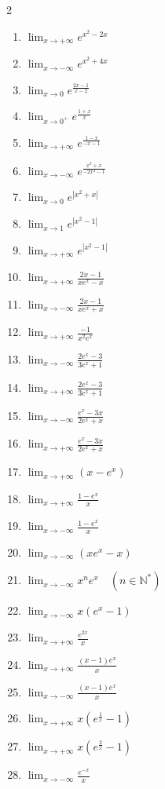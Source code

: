 \documentclass[12pt,a4paper]{article}
\begin{document}
\begin{multicols}{2}
\begin{enumerate}
\item $\lim_{x \to +\infty} e^{x^2 - 2x}$
\item $\lim_{x \to -\infty} e^{x^2 + 4x}$
\item $\lim_{x \to 0} e^{\frac{2x - 1}{x - 2}}$
\item $\lim_{x \to 0^+} e^{\frac{1 + x}{x}}$

\item $\lim_{x \to +\infty} e^{\frac{1 - x}{-x - 1}}$
\item $\lim_{x \to -\infty} e^{\frac{x^3 + x}{-2x^2 - 1}}$
\item $\lim_{x \to 0} e^{|x^2 + x|}$
\item $\lim_{x \to 1} e^{|x^2 - 1|}$

\item $\lim_{x \to +\infty} e^{|x^2 - 1|}$
\item $\lim_{x \to +\infty} \frac{2x - 1}{x e^x - x}$
\item $\lim_{x \to -\infty} \frac{2x - 1}{x e^x + x}$
\item $\lim_{x \to +\infty} \frac{-1}{x^2 e^x}$

\item $\lim_{x \to -\infty} \frac{2e^x - 3}{3e^x + 1}$
\item $\lim_{x \to +\infty} \frac{2e^x - 3}{3e^x + 1}$
\item $\lim_{x \to -\infty} \frac{e^x - 3x}{2e^x + x}$
\item $\lim_{x \to +\infty} \frac{e^x - 3x}{2e^x + x}$

\item $\lim_{x \to +\infty} (x - e^x)$
\item $\lim_{x \to +\infty} \frac{1 - e^x}{x}$
\item $\lim_{x \to -\infty} \frac{1 - e^x}{x}$
\item $\lim_{x \to -\infty} (x e^x - x)$

\item $\lim_{x \to -\infty} x^n e^x \quad (n \in \mathbb{N}^*)$
\item $\lim_{x \to -\infty} x(e^x - 1)$
\item $\lim_{x \to +\infty} \frac{e^{2x}}{x}$
\item $\lim_{x \to +\infty} \frac{(x - 1)e^x}{x}$

\item $\lim_{x \to -\infty} \frac{(x - 1)e^x}{x}$
\item $\lim_{x \to +\infty} x \left(e^{\frac{1}{x}} - 1\right)$
\item $\lim_{x \to +\infty} x \left(e^{\frac{2}{x}} - 1\right)$
\item $\lim_{x \to -\infty} \frac{e^{-x}}{x}$


\end{enumerate}
\end{multicols}
\end{document}
